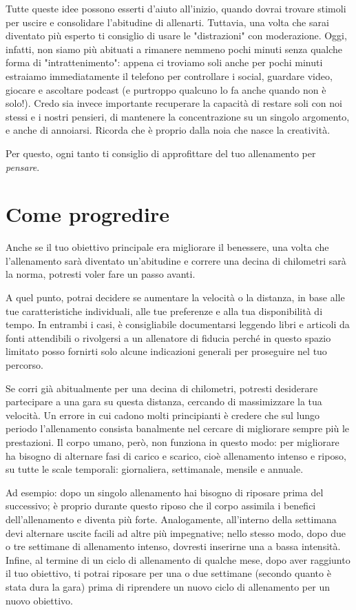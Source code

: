 Tutte queste idee possono esserti d'aiuto all'inizio,
quando dovrai trovare stimoli per uscire e
consolidare l'abitudine di allenarti.
Tuttavia, una volta che sarai diventato più esperto ti consiglio di usare
le "distrazioni" con moderazione.
Oggi, infatti, non siamo più abituati a rimanere
nemmeno pochi minuti senza qualche forma di "intrattenimento":
appena ci troviamo soli anche per pochi minuti estraiamo
immediatamente il telefono
per controllare i social, guardare video, giocare e ascoltare podcast
(e purtroppo qualcuno lo fa anche quando non è solo!).
Credo sia invece importante recuperare la capacità
di restare soli con noi stessi e i nostri pensieri,
di mantenere la concentrazione su un singolo argomento,
e anche di annoiarsi.
Ricorda che è proprio dalla noia che nasce la creatività.

Per questo, ogni tanto ti consiglio di approfittare del tuo allenamento
per \emph{pensare}.


\chapter{Come progredire}
Anche se il tuo obiettivo principale era migliorare il benessere,
una volta che l'allenamento sarà diventato un'abitudine
e correre una decina di chilometri sarà la norma,
potresti voler fare un passo avanti.

A quel punto, potrai decidere se aumentare la velocità
o la distanza, in base alle tue caratteristiche individuali,
alle tue preferenze
e alla tua disponibilità di tempo.
In entrambi i casi, è consigliabile documentarsi
leggendo libri e articoli da fonti attendibili
o rivolgersi a un allenatore di fiducia
perché in questo spazio limitato posso fornirti
solo alcune indicazioni generali
per proseguire nel tuo percorso.

Se corri già abitualmente per una decina di chilometri, potresti desiderare
partecipare a una gara su questa distanza, cercando di massimizzare la tua velocità.
Un errore in cui cadono molti principianti è credere che sul lungo periodo 
l'allenamento consista banalmente nel cercare di migliorare sempre più le
prestazioni.
Il corpo umano, però, non funziona in questo modo:
per migliorare ha bisogno di alternare fasi di
carico e scarico, cioè allenamento intenso e riposo,
su tutte le scale temporali: giornaliera, settimanale, mensile e annuale.

Ad esempio: dopo un singolo allenamento hai bisogno di riposare
prima del successivo; è proprio durante questo riposo che il corpo
assimila i benefici dell'allenamento e diventa più forte.
Analogamente,
all'interno della settimana devi alternare uscite facili
ad altre più impegnative;
nello stesso modo,
dopo due o tre settimane di allenamento intenso, dovresti inserirne una
a bassa intensità.
Infine, al termine di un ciclo di allenamento di qualche mese,
dopo aver raggiunto il tuo obiettivo,
ti potrai riposare per una o due settimane (secondo quanto è stata dura la gara)
prima di riprendere un nuovo ciclo di allenamento per un nuovo obiettivo.

